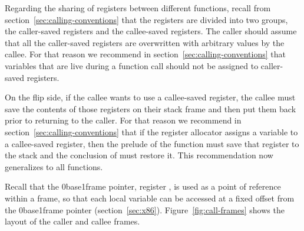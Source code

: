 \documentclass[7x10]{TimesAPriori_MIT}%
\def\xeightysixEd{0}
\def\riscvEd{1}
\def\architecture{1}
\newcommand\ifriscv[1]{\if\architecture\riscvEd{#1}\fi}
\newcommand\ifxeightsix[1]{\if\architecture\xeightysixEd{#1}\fi}
\numberwithin{theorem}{chapter}
\numberwithin{definition}{chapter}
\numberwithin{equation}{chapter}
\begin{document}
Regarding the sharing of registers between different functions, recall
from section~\ref{sec:calling-conventions} that the registers are
divided into two groups, the caller-saved registers and the
callee-saved registers. The caller should assume that all the
caller-saved registers are overwritten with arbitrary values by the
callee. For that reason we recommend in
section~\ref{sec:calling-conventions} that variables that are live
during a function call should not be assigned to caller-saved
registers.

On the flip side, if the callee wants to use a callee-saved register,
the callee must save the contents of those registers on their stack
frame and then put them back prior to returning to the caller.  For
that reason we recommend in section~\ref{sec:calling-conventions} that if
the register allocator assigns a variable to a callee-saved register,
then the prelude of the  function must save that register
to the stack and the conclusion of  must restore it.  This
recommendation now generalizes to all functions.

Recall that the \ifxeightsix{base}\ifriscv{frame} pointer, register \FP, is used as a
point of reference within a frame, so that each local variable can be
accessed at a fixed offset from the \ifxeightsix{base}\ifriscv{frame} pointer
(section~\ref{sec:x86}).
%
Figure~\ref{fig:call-frames} shows the layout of the caller and callee
frames.
\end{document}
